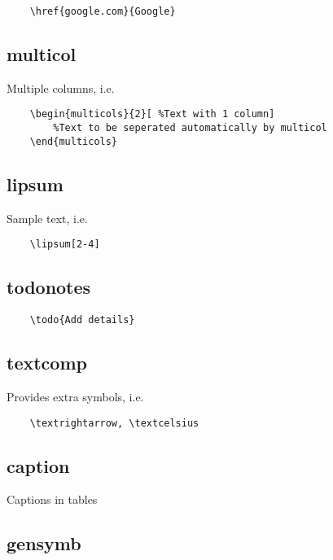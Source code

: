 \documentclass{article}
\begin{document}
\begin{verbatim}
	\href{google.com}{Google}
\end{verbatim} 

\subsection{multicol}

Multiple columns, i.e.

\begin{verbatim}
	\begin{multicols}{2}[ %Text with 1 column]	
		%Text to be seperated automatically by multicol 
	\end{multicols}
\end{verbatim}

\subsection{lipsum}

Sample text, i.e.

\begin{verbatim}
	\lipsum[2-4]
\end{verbatim}

\subsection{todonotes}

\begin{verbatim}
	\todo{Add details} 
\end{verbatim}

\subsection{textcomp}

Provides extra symbols, i.e.

\begin{verbatim}
	\textrightarrow, \textcelsius
\end{verbatim}

\subsection{caption}

Captions in tables

\subsection{gensymb}
\end{document}
